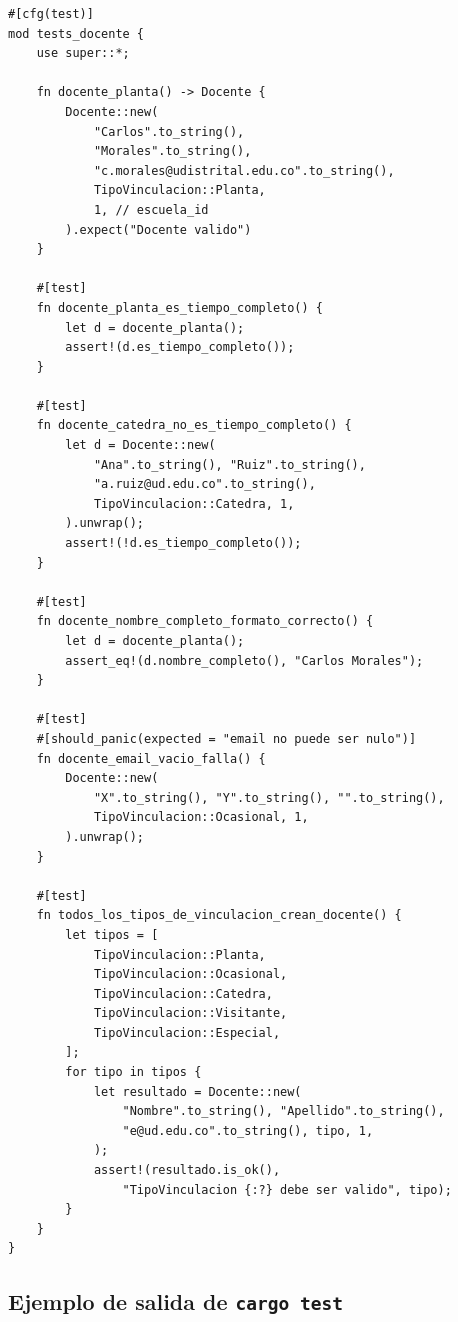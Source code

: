 \begin{lstlisting}[style=rustStyle,
  caption={Módulo de pruebas para el \textit{struct} \texttt{Docente} en \rust.},
  label={lst:rust-pruebas-docente}]
#[cfg(test)]
mod tests_docente {
    use super::*;

    fn docente_planta() -> Docente {
        Docente::new(
            "Carlos".to_string(),
            "Morales".to_string(),
            "c.morales@udistrital.edu.co".to_string(),
            TipoVinculacion::Planta,
            1, // escuela_id
        ).expect("Docente valido")
    }

    #[test]
    fn docente_planta_es_tiempo_completo() {
        let d = docente_planta();
        assert!(d.es_tiempo_completo());
    }

    #[test]
    fn docente_catedra_no_es_tiempo_completo() {
        let d = Docente::new(
            "Ana".to_string(), "Ruiz".to_string(),
            "a.ruiz@ud.edu.co".to_string(),
            TipoVinculacion::Catedra, 1,
        ).unwrap();
        assert!(!d.es_tiempo_completo());
    }

    #[test]
    fn docente_nombre_completo_formato_correcto() {
        let d = docente_planta();
        assert_eq!(d.nombre_completo(), "Carlos Morales");
    }

    #[test]
    #[should_panic(expected = "email no puede ser nulo")]
    fn docente_email_vacio_falla() {
        Docente::new(
            "X".to_string(), "Y".to_string(), "".to_string(),
            TipoVinculacion::Ocasional, 1,
        ).unwrap();
    }

    #[test]
    fn todos_los_tipos_de_vinculacion_crean_docente() {
        let tipos = [
            TipoVinculacion::Planta,
            TipoVinculacion::Ocasional,
            TipoVinculacion::Catedra,
            TipoVinculacion::Visitante,
            TipoVinculacion::Especial,
        ];
        for tipo in tipos {
            let resultado = Docente::new(
                "Nombre".to_string(), "Apellido".to_string(),
                "e@ud.edu.co".to_string(), tipo, 1,
            );
            assert!(resultado.is_ok(),
                "TipoVinculacion {:?} debe ser valido", tipo);
        }
    }
}
\end{lstlisting}

\subsection{Ejemplo de salida de \texttt{cargo test}}
\label{subsec:rust-cargo-test-output}

